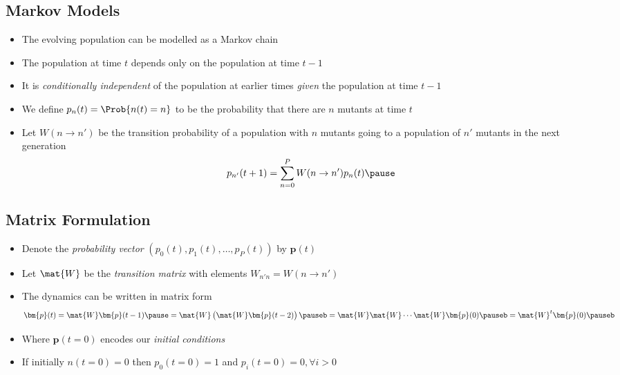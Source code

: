 \begin{slide}
\section[-2]{Markov Models}

\begin{PauseHighLight}
  \begin{itemize}\squeeze
  \item The evolving population can be modelled as a Markov chain\pause
  \item The population at time $t$ depends only on the population at
    time $t-1$\pause
  \item It is \textit{conditionally independent} of the population at
    earlier times \textit{given} the population at time $t-1$\pause
  \item We define $p_n(t)=\Prob{n(t)=n}$ to be the probability that
    there are $n$ mutants at time $t$\pause
  \item Let $W(n\rightarrow n')$ be the transition probability of a
    population with $n$ mutants going to a population of $n'$ mutants in
    the next generation\pause
    \begin{align*}
      p_{n'}(t+1) = \sum_{n=0}^P W(n\rightarrow n') p_n(t)\pause
    \end{align*}
  \end{itemize}
\end{PauseHighLight}

\end{slide}


\begin{slide}
\section[-1]{Matrix Formulation}

\begin{PauseHighLight}
  \begin{itemize}
  \item Denote the \textit{probability vector} $(p_0(t), p_1(t), \ldots,
    p_P(t))$ by $\bm{p}(t)$\pause
  \item Let $\mat{W}$ be the \textit{transition matrix} with elements
    $W_{n' n} =W(n\rightarrow n')$\pause
  \item The dynamics can be written in matrix form
    \begin{align*}
      \bm{p}(t) = \mat{W} \bm{p}(t-1) \pause
      = \mat{W} \left( \strut \mat{W} \bm{p}(t-2) \right) \pauseb
      = \mat{W} \mat{W} \cdots \mat{W} \bm{p}(0)\pauseb
      = \mat{W}^t \bm{p}(0)\pauseb
    \end{align*}
  \item Where $\bm{p}(t=0)$ encodes our \textit{initial conditions}\pause
  \item If initially $n(t=0)=0$ then $p_0(t=0)=1$ and $p_i(t=0)=0, \forall
    i>0$\pause
  \end{itemize}
\end{PauseHighLight}

\end{slide}



